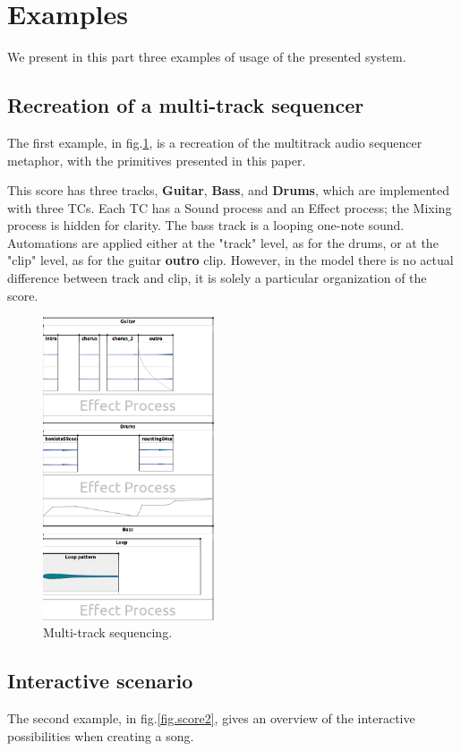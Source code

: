 \documentclass{article}
\newcommand*{\timeconstraint}{\ac{TC}\xspace}
\newcommand*{\timeconstraints}{\acp{TC}\xspace}
\begin{document}
\section{Examples}
We present in this part three examples of usage of the presented system.

\subsection{Recreation of a multi-track sequencer}
The first example, in fig.\ref{fig.score1}, is a recreation of the multitrack audio sequencer metaphor, with the primitives presented in this paper.
 
This score has three tracks, \textbf{Guitar}, \textbf{Bass}, and \textbf{Drums}, which are implemented with three \timeconstraints.
Each \timeconstraint has a Sound process and an Effect process; the Mixing process is hidden for clarity.
The bass track is a looping one-note sound. Automations are applied either at the "track" level, as for the drums, or at the "clip" level, as for the guitar \textbf{outro} clip. 
However, in the model there is no actual difference between track and clip, it is solely a particular organization of the score.
 
\begin{figure}[h]
    \centering
    \includegraphics[width=0.45\textwidth]{figures/ex1.png}
    \caption{Multi-track sequencing.}
    \label{fig.score1}
\end{figure}

\subsection{Interactive scenario}
The second example, in fig.\ref{fig.score2}, gives an overview of the interactive possibilities when creating a song.
\end{document}
